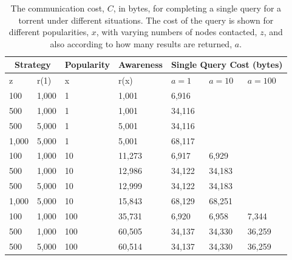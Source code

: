     \begin{table}
        \renewcommand{\arraystretch}{1.3}
        \caption{The communication cost, $C$, in bytes, for completing a single query for a torrent under different situations. The cost of the query is shown for different popularities, $x$, with varying numbers of nodes contacted, $z$, and also according to how many results are returned, $a$.}
        \label{tab:single_query}
        \centering
        \begin{tabular}{l|l|l|l|l|l|l}
            \hline
            \multicolumn{2}{c|}{Strategy} &   Popularity &     Awareness & \multicolumn{3}{|c}{Single Query Cost (bytes)} \\ \hline
                z &                   r(1) &            x &          r(x) &        $a=1$ &       $a=10$ &           $a=100$ \\ \hline
              100 &                  1,000 &            1 &         1,001 &        6,916 &            ~ &                 ~ \\
              500 &                  1,000 &            1 &         1,001 &       34,116 &            ~ &                 ~ \\
              500 &                  5,000 &            1 &         5,001 &       34,116 &            ~ &                 ~ \\
            1,000 &                  5,000 &            1 &         5,001 &       68,117 &            ~ &                 ~ \\ \hline
              100 &                  1,000 &           10 &        11,273 &        6,917 &        6,929 &                 ~ \\
              500 &                  1,000 &           10 &        12,986 &       34,122 &       34,183 &                 ~ \\
              500 &                  5,000 &           10 &        12,999 &       34,122 &       34,183 &                 ~ \\
            1,000 &                  5,000 &           10 &        15,843 &       68,129 &       68,251 &                 ~ \\ \hline
              100 &                  1,000 &          100 &        35,731 &        6,920 &        6,958 &             7,344 \\
              500 &                  1,000 &          100 &        60,505 &       34,137 &       34,330 &            36,259 \\
              500 &                  5,000 &          100 &        60,514 &       34,137 &       34,330 &            36,259 \\

\end{tabular}
\end{table}
